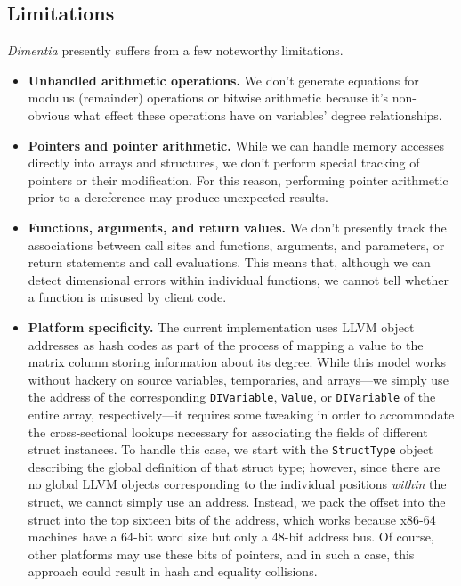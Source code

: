 \documentclass[12pt]{article}
\begin{document}
\subsection{Limitations}

\textit{Dimentia} presently suffers from a few noteworthy limitations.

\begin{itemize}
\item \textbf{Unhandled arithmetic operations.}
We don't generate equations for modulus (remainder) operations or bitwise arithmetic because it's non-obvious what effect these operations have on variables' degree relationships.

\item \textbf{Pointers and pointer arithmetic.}
While we can handle memory accesses directly into arrays and structures, we don't perform special tracking of pointers or their modification.
For this reason, performing pointer arithmetic prior to a dereference may produce unexpected results.

\item \textbf{Functions, arguments, and return values.}
We don't presently track the associations between call sites and functions, arguments, and parameters, or return statements and call evaluations.
This means that, although we can detect dimensional errors within individual functions, we cannot tell whether a function is misused by client code.

\item \textbf{Platform specificity.}
The current implementation uses LLVM object addresses as hash codes as part of the process of mapping a value to the matrix column storing information about its degree.
While this model works without hackery on source variables, temporaries, and arrays---we simply use the address of the corresponding \texttt{DIVariable}, \texttt{Value}, or \texttt{DIVariable} of the entire array, respectively---it requires some tweaking in order to accommodate the cross-sectional lookups necessary for associating the fields of different struct instances.
To handle this case, we start with the \texttt{StructType} object describing the global definition of that struct type; however, since there are no global LLVM objects corresponding to the individual positions \textit{within} the struct, we cannot simply use an address.
Instead, we pack the offset into the struct into the top sixteen bits of the address, which works because x86-64 machines have a 64-bit word size but only a 48-bit address bus.
Of course, other platforms may use these bits of pointers, and in such a case, this approach could result in hash and equality collisions.


\end{itemize}
\end{document}

